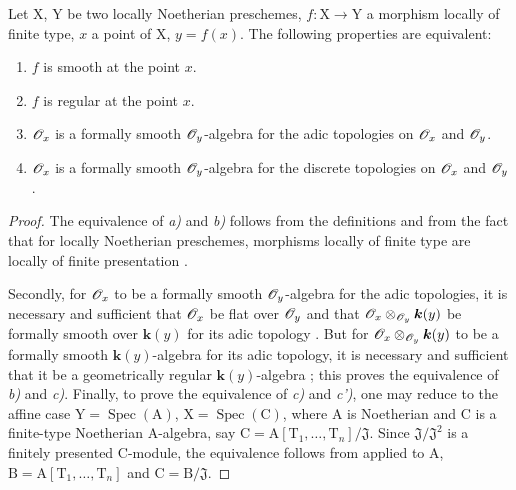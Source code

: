 \begin{theorem}[6.8.6]
\label{IV.6.8.6}
Let $\mathrm{X}$, $\mathrm{Y}$ be two locally Noetherian preschemes, $f:\mathrm{X}\to\mathrm{Y}$ a morphism locally of finite type, $x$ a point of $\mathrm{X}$, $y=f(x)$. The following properties are equivalent:
\begin{enumerate}[label=\emph{\alph*)}]
  \item $f$ is smooth at the point $x$.
  \item $f$ is regular at the point $x$.
  \item $\mathscr{O}_x$ is a formally smooth $\mathscr{O}_y$-algebra  for the adic topologies on $\mathscr{O}_x$ and $\mathscr{O}_y$.
  \item[\emph{c$'$)}] $\mathscr{O}_x$ is a formally smooth $\mathscr{O}_y$-algebra  for the discrete topologies on $\mathscr{O}_x$ and $\mathscr{O}_y$.
\end{enumerate}
\end{theorem}

\begin{proof}
The equivalence of \emph{a)} and \emph{b)} follows from the definitions  and from the fact that for locally Noetherian preschemes, morphisms locally of finite type are locally of finite presentation .

Secondly, for $\mathscr{O}_x$ to be a formally smooth $\mathscr{O}_y$-algebra for the adic topologies, it is necessary and sufficient that $\mathscr{O}_x$ be flat over $\mathscr{O}_y$ and that $\mathscr{O}_x\otimes_{\mathscr{O}_y}\boldsymbol{k}(y)$ be formally smooth over $\boldsymbol{k}(y)$ for its adic topology . But for $\mathscr{O}_x\otimes_{\mathscr{O}_y}\boldsymbol{k}(y)$ to be a formally smooth $\boldsymbol{k}(y)$-algebra for its adic topology, it is necessary and sufficient that it be a geometrically regular $\boldsymbol{k}(y)$-algebra ; this proves the equivalence of \emph{b)} and \emph{c)}. Finally, to prove the equivalence of \emph{c)} and \emph{c')}, one may reduce to the affine case $\mathrm{Y}=\operatorname{Spec}(\mathrm{A})$, $\mathrm{X}=\operatorname{Spec}(\mathrm{C})$, where $\mathrm{A}$ is Noetherian and $\mathrm{C}$ is a finite-type Noetherian $\mathrm{A}$-algebra, say $\mathrm{C}=\mathrm{A}[\mathrm{T}_1,\ldots,\mathrm{T}_n]/\mathfrak{J}$. Since $\mathfrak{J}/\mathfrak{J}^2$ is a finitely presented $\mathrm{C}$-module, the equivalence follows from  applied to $\mathrm{A}$, $\mathrm{B}=\mathrm{A}[\mathrm{T}_1,\ldots,\mathrm{T}_n]$ and $\mathrm{C}=\mathrm{B}/\mathfrak{J}$.
\end{proof}

